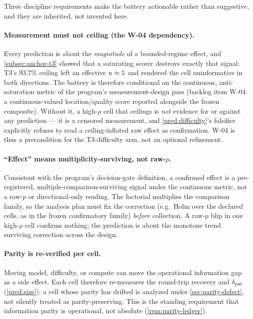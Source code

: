 Three discipline requirements make the battery actionable rather than
suggestive, and they are inherited, not invented here.

\paragraph{Measurement must not ceiling (the W-04 dependency).}
Every prediction is about the \emph{magnitude} of a bounded-regime effect, and
\cref{subsec:anchor-t3} showed that a saturating scorer destroys exactly that
signal: T3's $93.7\%$ ceiling left an effective $n\approx 5$ and rendered
the cell uninformative in both directions. The battery is therefore conditional
on the continuous, anti-saturation metric of the program's measurement-design
pass (backlog item W-04: a continuous-valued location/quality score reported
alongside the frozen composite). Without it, a high-$\rho$ cell that ceilings is
\emph{not} evidence for or against any prediction --- it is a censored
measurement, and \cref{pred:difficulty}'s falsifier explicitly refuses to read a
ceiling-inflated raw effect as confirmation. W-04 is thus a precondition for the
T3-difficulty arm, not an optional refinement.

\paragraph{``Effect'' means multiplicity-surviving, not raw-$p$.}
Consistent with the program's decision-gate definition, a confirmed effect is a
pre-registered, multiple-comparison-surviving signal under the continuous
metric, not a raw-$p$ or directional-only reading. The factorial multiplies the
comparison family, so the analysis plan must fix the correction (e.g.\ Holm over
the declared cells, as in the frozen confirmatory family) \emph{before}
collection. A raw-$p$ blip in one high-$\rho$ cell confirms nothing; the
prediction is about the monotone trend surviving correction across the design.

\paragraph{Parity is re-verified per cell.}
Moving model, difficulty, or compute can move the operational information gap as
a side effect. Each cell therefore re-measures the round-trip recovery and
$\delta_{\mathrm{par}}$ (\cref{pred:size}); a cell whose parity has drifted is analyzed
under \cref{sec:parity-defect}, not silently treated as parity-preserving. This
is the standing requirement that information parity is operational, not absolute
(\cref{rem:parity-ledger}).

